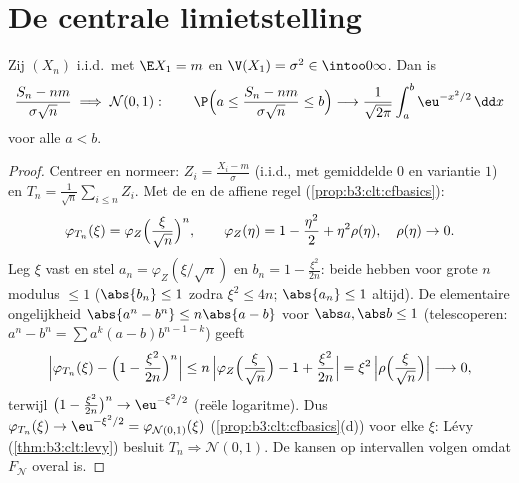 \section{De centrale limietstelling}

\begin{theorem}\label{thm:b3:clt:clt}
Zij $(X_n)$ i.i.d.\ met $\E X_1 = m$ en $\V(X_1) = \sigma^2 \in
\intoo0\infty$. Dan is
\[
\frac{S_n - nm}{\sigma\sqrt n} \;\Longrightarrow\; \mathcal
N(0, 1) :
\qquad
\P\Bigl(a \leq \frac{S_n - nm}{\sigma\sqrt n} \leq
b\Bigr) \longrightarrow
\frac{1}{\sqrt{2\pi}}\int_a^b\eu^{-x^2/2}\,\dd x
\]
voor alle $a < b$.
\end{theorem}

\begin{proof}
Centreer en normeer: $Z_i = \frac{X_i - m}{\sigma}$ (i.i.d., met
gemiddelde $0$ en variantie $1$) en $T_n = \frac1{\sqrt
n}\sum_{i\leq n}Z_i$. Met de  en de affiene
regel (\cref{prop:b3:clt:cfbasics}):
\[
\varphi_{T_n}(\xi) =
\varphi_{Z}\Bigl(\frac{\xi}{\sqrt n}\Bigr)^{n},
\qquad
\varphi_Z(\eta) = 1 - \frac{\eta^2}2 + \eta^2\rho(\eta),\quad
\rho(\eta)\to0 .
\]
Leg $\xi$ vast en stel $a_n = \varphi_Z(\xi/\sqrt n)$ en $b_n = 1
- \frac{\xi^2}{2n}$: beide hebben voor grote $n$ modulus $\leq 1$
($\abs{b_n} \leq 1$ zodra $\xi^2 \leq 4n$; $\abs{a_n} \leq 1$
altijd). De elementaire ongelijkheid $\abs{a^n - b^n} \leq
n\abs{a - b}$ voor $\abs a, \abs b \leq 1$ (telescoperen: $a^n -
b^n = \sum a^k(a - b)b^{n-1-k}$) geeft
\[
\Bigl|\varphi_{T_n}(\xi) - \Bigl(1 -
\frac{\xi^2}{2n}\Bigr)^{n}\Bigr|
\leq n\,\Bigl|\varphi_Z\Bigl(\frac\xi{\sqrt n}\Bigr) - 1 +
\frac{\xi^2}{2n}\Bigr|
= \xi^2\,\Bigl|\rho\Bigl(\frac{\xi}{\sqrt n}\Bigr)\Bigr|
\longrightarrow 0,
\]
terwijl $\bigl(1 - \frac{\xi^2}{2n}\bigr)^n \to \eu^{-\xi^2/2}$
(reële logaritme). Dus $\varphi_{T_n}(\xi) \to \eu^{-\xi^2/2} =
\varphi_{\mathcal N(0,1)}(\xi)$
(\cref{prop:b3:clt:cfbasics}(d)) voor elke $\xi$: Lévy
(\cref{thm:b3:clt:levy}) besluit $T_n \Rightarrow \mathcal
N(0,1)$. De kansen op intervallen volgen omdat $F_{\mathcal N}$
overal  is.
\end{proof}

